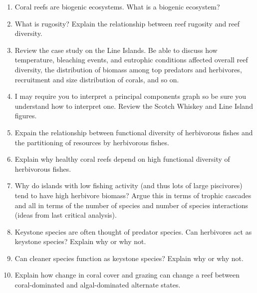 \documentclass[letterpaper]{tufte-handout}
\begin{document}
\begin{enumerate}

\item
  Coral reefs are biogenic ecosystems. What is a biogenic ecosystem? 
  
\item What is rugosity? Explain the relationship between reef rugosity and reef diversity.

\item Review the case study on the Line Islands. Be able to discuss how temperature, bleaching events, and eutrophic conditions affected overall reef diversity, the distribution of biomass among top predators and herbivores, recruitment and size distribution of corals, and so on.

\item I may require you to interpret a principal components graph so be sure you understand how to interpret one. Review the Scotch Whiskey and Line Island figures.

\item Expain the relationship between functional diversity of herbivorous fishes and the partitioning of resources by herbivorous fishes.

\item Explain why healthy coral reefs depend on high functional diversity of herbivorous fishes. 

\item Why do islands with low fishing activity (and thus lots of large piscivores) tend to have high herbivore biomass? Argue this in terms of trophic cascades and all in terms of the number of species and number of species interactions (ideas from last critical analysis).

\item Keystone species are often thought of predator species. Can herbivores act as keystone species? Explain why or why not. 

\item Can cleaner species function as keystone species? Explain why or why not.

\item Explain how change in coral cover and grazing can change a reef between coral-dominated and algal-dominated alternate states.


\end{enumerate}
\end{document}
